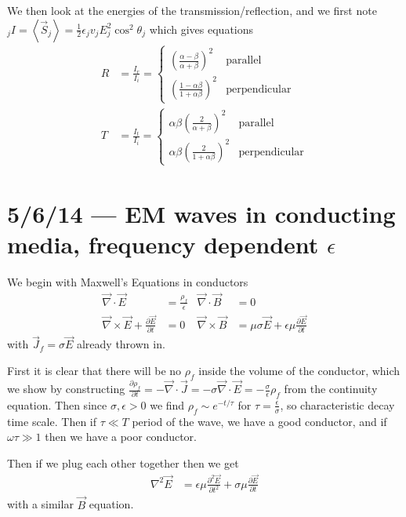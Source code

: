 \documentclass[10pt]{report}
\newcommand{\pd}[2]{\frac{\partial #1}{\partial#2}}
\newcommand{\ptd}[2]{\frac{\partial^2 #1}{\partial#2^2}}
\newcommand{\expvalue}[1]{\left<#1\right>}
\begin{document}
We then look at the energies of the transmission/reflection, and we first note $_jI = \expvalue{\vec{S}_j} = \frac{1}{2}\epsilon_j v_j E_j^2 \cos^2\theta_j$ which gives equations
\begin{align}
    R &= \frac{I_r}{I_i} =
    \begin{cases}
        \left( \frac{\alpha - \beta}{\alpha + \beta} \right)^2 & \text{parallel}\\
        \left( \frac{1 - \alpha \beta}{1 + \alpha \beta} \right)^2 & \text{perpendicular}
    \end{cases}\\
    T &= \frac{I_t}{I_i} =
    \begin{cases}
        \alpha \beta\left( \frac{2}{\alpha + \beta} \right)^2 & \text{parallel}\\
        \alpha \beta\left( \frac{2}{1 + \alpha \beta} \right)^2 & \text{perpendicular}
    \end{cases}
\end{align}

\chapter{5/6/14 --- EM waves in conducting media, frequency dependent $\epsilon$}

We begin with Maxwell's Equations in conductors
\begin{align}
    \vec{\nabla} \cdot \vec{E} &= \frac{\rho_f}{\epsilon} & \vec{\nabla} \cdot \vec{B} &= 0\\
    \vec{\nabla} \times \vec{E} + \pd{\vec{E}}{t} &= 0 & \vec{\nabla} \times \vec{B} &= \mu \sigma \vec{E} + \epsilon \mu \pd{\vec{E}}{t}
\end{align}
with $\vec{J}_f = \sigma \vec{E}$ already thrown in. 

First it is clear that there will be no $\rho_f$ inside the volume of the conductor, which we show by constructing $\pd{\rho_f}{t} = -\vec{\nabla} \cdot \vec{J} = -\sigma \vec{\nabla} \cdot \vec{E} = -\frac{\sigma}{\epsilon} \rho_f$ from the continuity equation. Then since $\sigma,\epsilon > 0$ we find $\rho_f \sim e^{-t/\tau}$ for $\tau = \frac{\epsilon}{\sigma}$, so characteristic decay time scale. Then if $\tau \ll T$ period of the wave, we have a good conductor, and if $\omega \tau \gg 1$ then we have a poor conductor.

Then if we plug each other together then we get
\begin{align}
    \nabla^2 \vec{E} &= \epsilon \mu \ptd{\vec{E}}{t} + \sigma \mu \pd{\vec{E}}{t}
\end{align}
with a similar $\vec{B}$ equation.
\end{document}
